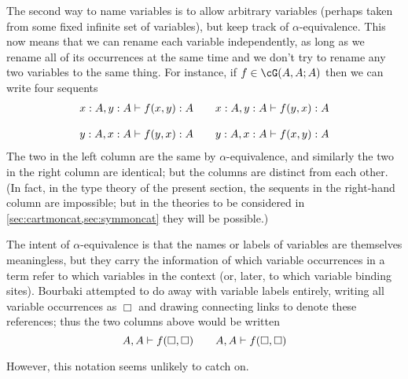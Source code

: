 \documentclass{book}
\let\types\vdash
\begin{document}
The second way to name variables is to allow arbitrary variables (perhaps taken from some fixed infinite set of variables), but keep track of $\alpha$-equivalence.
This now means that we can rename each variable independently, as long as we rename all of its occurrences at the same time and we don't try to rename any two variables to the same thing.
For instance, if $f\in\cG(A,A;A)$ then we can write four sequents
\[
\begin{array}{c@{\qquad}c}
  x:A, y:A \types f(x,y):A &
  x:A, y:A \types f(y,x):A \\\\
  y:A, x:A \types f(y,x):A &
  y:A, x:A \types f(x,y):A
\end{array}
\]
The two in the left column are the same by $\alpha$-equivalence, and similarly the two in the right column are identical; but the columns are distinct from each other.
(In fact, in the type theory of the present section, the sequents in the right-hand column are impossible; but in the theories to be considered in \cref{sec:cartmoncat,sec:symmoncat} they will be possible.)

\begin{rmk}
The intent of $\alpha$-equivalence is that the names or labels of variables are themselves meaningless, but they carry the information of which variable occurrences in a term refer to which variables in the context (or, later, to which variable binding sites).
Bourbaki attempted to do away with variable labels entirely, writing all variable occurrences as $\Box$ and drawing connecting links to denote these references; thus the two columns above would be written
\[
\tikz[remember picture] \node[rectangle, inner sep=0pt] (a1) {$A$};,
\tikz[remember picture] \node[rectangle, inner sep=0pt] (a2) {$A$}; \types
f(\tikz[remember picture] \node[rectangle, inner sep=0pt] (b1) {$\Box$};,
\tikz[remember picture] \node[rectangle, inner sep=0pt] (b2) {$\Box$};)
\qquad
\tikz[remember picture] \node[rectangle, inner sep=0pt] (a1p) {$A$};,
\tikz[remember picture] \node[rectangle, inner sep=0pt] (a2p) {$A$}; \types
f(\tikz[remember picture] \node[rectangle, inner sep=0pt] (b2p) {$\Box$};,
\tikz[remember picture] \node[rectangle, inner sep=0pt] (b1p) {$\Box$};)
\]

\noindent
However, this notation seems unlikely to catch on.
\end{rmk}
\end{document}
